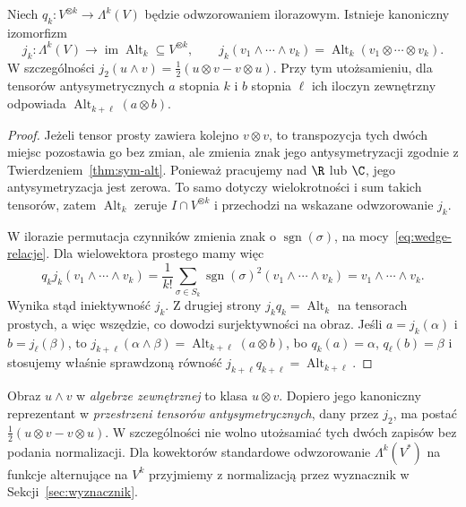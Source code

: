 \begin{twierdzenie}
\label{thm:wedge-alt}
Niech $q_k\colon V^{\otimes k}\to\Lambda^k(V)$ będzie odwzorowaniem
ilorazowym. Istnieje kanoniczny izomorfizm
\[
 j_k\colon\Lambda^k(V)\longrightarrow
 \operatorname{im}\operatorname{Alt}_k\subseteq V^{\otimes k},
 \qquad j_k(v_1\wedge\cdots\wedge v_k)
 =\operatorname{Alt}_k(v_1\otimes\cdots\otimes v_k).
\]
W szczególności $j_2(u\wedge v)=
\tfrac12(u\otimes v-v\otimes u)$. Przy tym utożsamieniu,
dla tensorów antysymetrycznych $a$ stopnia $k$ i $b$ stopnia
$\ell$ ich iloczyn zewnętrzny odpowiada
$\operatorname{Alt}_{k+\ell}(a\otimes b)$.
\end{twierdzenie}
\begin{proof}
Jeżeli tensor prosty zawiera kolejno $v\otimes v$, to
transpozycja tych dwóch miejsc pozostawia go bez zmian,
ale zmienia znak jego antysymetryzacji zgodnie z
Twierdzeniem~\ref{thm:sym-alt}. Ponieważ pracujemy nad
$\R$ lub $\C$, jego antysymetryzacja jest zerowa.
To samo dotyczy wielokrotności i sum takich tensorów,
zatem $\operatorname{Alt}_k$ zeruje $I\cap V^{\otimes k}$
i przechodzi na wskazane odwzorowanie $j_k$.

W ilorazie permutacja czynników zmienia znak o
$\operatorname{sgn}(\sigma)$, na mocy~\eqref{eq:wedge-relacje}.
Dla wielowektora prostego mamy więc
\[
 q_kj_k(v_1\wedge\cdots\wedge v_k)
 =\frac1{k!}\sum_{\sigma\in S_k}
 \operatorname{sgn}(\sigma)^2
 (v_1\wedge\cdots\wedge v_k)
 =v_1\wedge\cdots\wedge v_k.
\]
Wynika stąd iniektywność $j_k$. Z drugiej strony
$j_kq_k=\operatorname{Alt}_k$ na tensorach prostych,
a więc wszędzie, co dowodzi surjektywności na obraz.
Jeśli $a=j_k(\alpha)$ i $b=j_\ell(\beta)$, to
$j_{k+\ell}(\alpha\wedge\beta)
=\operatorname{Alt}_{k+\ell}(a\otimes b)$,
bo $q_k(a)=\alpha$, $q_\ell(b)=\beta$ i stosujemy właśnie
sprawdzoną równość $j_{k+\ell}q_{k+\ell}=\operatorname{Alt}_{k+\ell}$.
\end{proof}

\begin{uwaga}
\label{rem:normalizacja-wedge}
Obraz $u\wedge v$ w \emph{algebrze zewnętrznej} to klasa
$u\otimes v$. Dopiero jego kanoniczny reprezentant w
\emph{przestrzeni tensorów antysymetrycznych}, dany przez $j_2$,
ma postać $\tfrac12(u\otimes v-v\otimes u)$. W szczególności
nie wolno utożsamiać tych dwóch zapisów bez podania
normalizacji. Dla kowektorów standardowe odwzorowanie
$\Lambda^k(V^*)$ na funkcje alternujące na $V^k$
przyjmiemy z normalizacją przez wyznacznik w
Sekcji~\ref{sec:wyznacznik}.
\end{uwaga}

